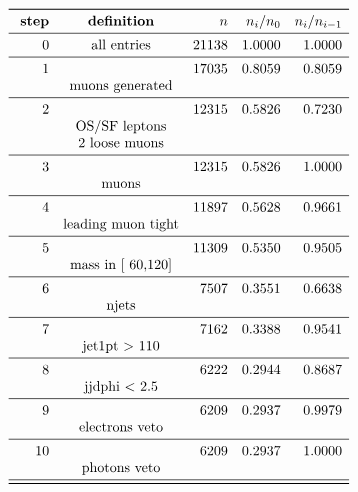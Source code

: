\documentclass[11pt,a4paper]{article}
\begin{document}
\begin{table}
\caption{\emph{Entries after each selection step, normalised to 5.00 $fb^{-1}$; n is the number of entries after the i-th selection step; Note that cuts on second jet are applied only if a second jet exists with $p_t$ > 30\,GeV.}}
\[
\begin{array}{rcrrr}
\toprule
\ \textbf{step}& \textbf{definition}  & n  &  n_i/n_0 & n_i/n_{i-1}  \\ 
\midrule
 0  & \text{all entries} &  21138 & 1.0000 & 1.0000 \\
\midrule
 1  & &  17035 & 0.8059 & 0.8059 \\
& \text{muons generated} & & & \\
\midrule
 2  & &  12315 & 0.5826 & 0.7230 \\
& \text{OS/SF leptons} & & & \\
& \text{2 loose muons} & & & \\
\midrule
 3  & &  12315 & 0.5826 & 1.0000 \\
& \text{muons} & & & \\
\midrule
 4  & &  11897 & 0.5628 & 0.9661 \\
& \text{leading muon tight} & & & \\
\midrule
 5  & &  11309 & 0.5350 & 0.9505 \\
& \text{mass in [ 60,120]} & & & \\
\midrule
 6  & &   7507 & 0.3551 & 0.6638 \\
& \text{njets} & & & \\
\midrule
 7  & &   7162 & 0.3388 & 0.9541 \\
& \text{jet1pt >  110} & & & \\
\midrule
 8  & &   6222 & 0.2944 & 0.8687 \\
& \text{jjdphi < 2.5} & & & \\
\midrule
 9  & &   6209 & 0.2937 & 0.9979 \\
& \text{electrons veto} & & & \\
\midrule
 10  & &   6209 & 0.2937 & 1.0000 \\
& \text{photons veto} & & & \\
\midrule
\bottomrule
\end{array}
\]
\end{table}
\end{document}

